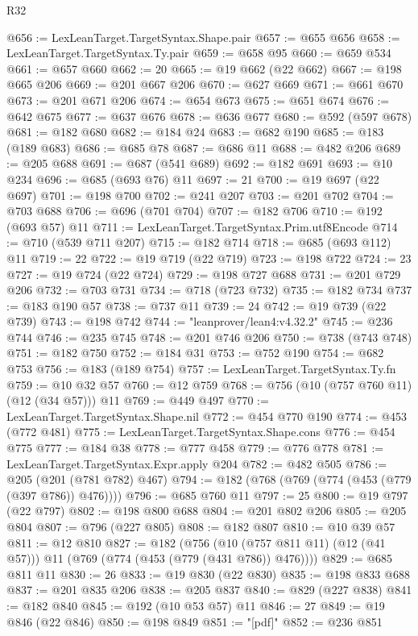 \begin{lexlean}{R32}
\begin{coremodule}
@656 := LexLeanTarget.TargetSyntax.Shape.pair
@657 := @655 @656
@658 := LexLeanTarget.TargetSyntax.Ty.pair
@659 := @658 @95
@660 := @659 @534
@661 := @657 @660
@662 := 20
@665 := @19 @662 (@22 @662)
@667 := @198 @665 @206
@669 := @201 @667 @206
@670 := @627 @669
@671 := @661 @670
@673 := @201 @671 @206
@674 := @654 @673
@675 := @651 @674
@676 := @642 @675
@677 := @637 @676
@678 := @636 @677
@680 := @592 (@597 @678)
@681 := @182 @680
@682 := @184 @24
@683 := @682 @190
@685 := @183 (@189 @683)
@686 := @685 @78
@687 := @686 @11
@688 := @482 @206
@689 := @205 @688
@691 := @687 (@541 @689)
@692 := @182 @691
@693 := @10 @234
@696 := @685 (@693 @76) @11
@697 := 21
@700 := @19 @697 (@22 @697)
@701 := @198 @700
@702 := @241 @207
@703 := @201 @702
@704 := @703 @688
@706 := @696 (@701 @704)
@707 := @182 @706
@710 := @192 (@693 @57) @11
@711 := LexLeanTarget.TargetSyntax.Prim.utf8Encode
@714 := @710 (@539 @711 @207)
@715 := @182 @714
@718 := @685 (@693 @112) @11
@719 := 22
@722 := @19 @719 (@22 @719)
@723 := @198 @722
@724 := 23
@727 := @19 @724 (@22 @724)
@729 := @198 @727 @688
@731 := @201 @729 @206
@732 := @703 @731
@734 := @718 (@723 @732)
@735 := @182 @734
@737 := @183 @190 @57
@738 := @737 @11
@739 := 24
@742 := @19 @739 (@22 @739)
@743 := @198 @742
@744 := "leanprover/lean4:v4.32.2"
@745 := @236 @744
@746 := @235 @745
@748 := @201 @746 @206
@750 := @738 (@743 @748)
@751 := @182 @750
@752 := @184 @31
@753 := @752 @190
@754 := @682 @753
@756 := @183 (@189 @754)
@757 := LexLeanTarget.TargetSyntax.Ty.fn
@759 := @10 @32 @57
@760 := @12 @759
@768 := @756 (@10 (@757 @760 @11) (@12 (@34 @57))) @11
@769 := @449 @497
@770 := LexLeanTarget.TargetSyntax.Shape.nil
@772 := @454 @770 @190
@774 := @453 (@772 @481)
@775 := LexLeanTarget.TargetSyntax.Shape.cons
@776 := @454 @775
@777 := @184 @38
@778 := @777 @458
@779 := @776 @778
@781 := LexLeanTarget.TargetSyntax.Expr.apply @204
@782 := @482 @505
@786 := @205 (@201 (@781 @782) @467)
@794 := @182 (@768 (@769 (@774 (@453 (@779 (@397 @786)) @476))))
@796 := @685 @760 @11
@797 := 25
@800 := @19 @797 (@22 @797)
@802 := @198 @800 @688
@804 := @201 @802 @206
@805 := @205 @804
@807 := @796 (@227 @805)
@808 := @182 @807
@810 := @10 @39 @57
@811 := @12 @810
@827 := @182
    (@756 (@10 (@757 @811 @11) (@12 (@41 @57))) @11 (@769 (@774 (@453 (@779 (@431 @786)) @476))))
@829 := @685 @811 @11
@830 := 26
@833 := @19 @830 (@22 @830)
@835 := @198 @833 @688
@837 := @201 @835 @206
@838 := @205 @837
@840 := @829 (@227 @838)
@841 := @182 @840
@845 := @192 (@10 @53 @57) @11
@846 := 27
@849 := @19 @846 (@22 @846)
@850 := @198 @849
@851 := "[pdf]"
@852 := @236 @851

\end{coremodule}
\end{lexlean}
